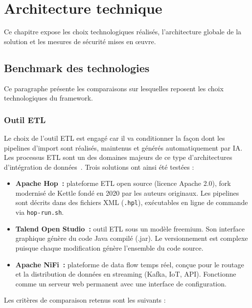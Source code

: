 \chapter{Architecture technique}
\label{chap:architecture}

Ce chapitre expose les choix technologiques réalisés, l'architecture globale de la solution et les mesures de sécurité mises en œuvre.

\section{Benchmark des technologies}
\label{sec:benchmark}

Ce paragraphe présente les comparaisons sur lesquelles reposent les choix technologiques du framework.

\subsection{Outil ETL}

Le choix de l'outil ETL est engagé car il va conditionner la façon dont les pipelines d'import sont réalisés, maintenus et générés automatiquement par IA. Les processus ETL sont un des domaines majeurs de ce type d'architectures d'intégration de données~\cite{vassiliadis2009}. Trois solutions ont ainsi été testées :

\begin{itemize}
    \item \textbf{Apache Hop~:} plateforme ETL open source (licence Apache 2.0), fork modernisé de Kettle fondé en 2020 par les auteurs originaux. Les pipelines sont décrits dans des fichiers XML (\texttt{.hpl}), exécutables en ligne de commande via \texttt{hop-run.sh}.
    \item \textbf{Talend Open Studio~:} outil ETL sous un modèle freemium. Son interface graphique génère du code Java compilé (.jar). Le versionnement est complexe puisque chaque modification génère l'ensemble du code source.
    \item \textbf{Apache NiFi~:} plateforme de data flow temps réel, conçue pour le routage et la distribution de données en streaming (Kafka, IoT, API). Fonctionne comme un serveur web permanent avec une interface de configuration.
\end{itemize}

Les critères de comparaison retenus sont les suivants :

